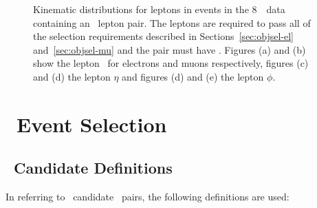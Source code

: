 \begin{figure}[h]
{        }
    \caption[Lepton kinematic distributions for \dilep\ events in the 8~\tev\
    data. ]
    {\small Kinematic distributions for leptons in events in the 8~\tev\
    data containing an \ossf\ lepton pair. The leptons are required to pass all of the selection
    requirements described in Sections~\ref{sec:objsel-el}
    and~\ref{sec:objsel-mu} and the pair must have \sstooos. 
    Figures (a) and (b) show the lepton \pt\ for electrons and muons
    respectively, figures (c) and (d) the lepton $\eta$ and figures (d) and (e)
    the lepton $\phi$.    }
\label{fig:dilep-lepkin-eight}
\end{figure}


\section{\ZZ\ Event Selection}
\label{sec:eventsel}

\subsection{\Z\ Candidate Definitions}

In referring to \Z\ candidate \dilep\ pairs, the following definitions are used:

